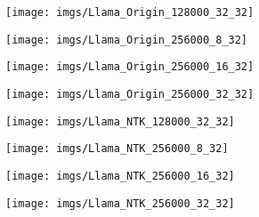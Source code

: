 
\clearpage
{}
\begin{figure*}[ht]
	\centering
	\begin{minipage}{\textwidth}
		\centering
		\begin{minipage}{0.24\textwidth}
			\centering
			\texttt{[image: imgs/Llama\_Origin\_128000\_32\_32]} %
		\end{minipage}%
		\begin{minipage}{0.24\textwidth}
			\centering
			\texttt{[image: imgs/Llama\_Origin\_256000\_8\_32]} %
		\end{minipage}%
		\begin{minipage}{0.24\textwidth}
			\centering
			\texttt{[image: imgs/Llama\_Origin\_256000\_16\_32]} %
		\end{minipage}%
		\begin{minipage}{0.24\textwidth}
			\centering
			\texttt{[image: imgs/Llama\_Origin\_256000\_32\_32]} %
		\end{minipage}
	\end{minipage}
	\begin{minipage}{\textwidth}
		\centering
		\begin{minipage}{0.24\textwidth}
			\centering
			\texttt{[image: imgs/Llama\_NTK\_128000\_32\_32]} %
		\end{minipage}%
		\begin{minipage}{0.24\textwidth}
			\centering
			\texttt{[image: imgs/Llama\_NTK\_256000\_8\_32]} %
		\end{minipage}%
		\begin{minipage}{0.24\textwidth}
			\centering
			\texttt{[image: imgs/Llama\_NTK\_256000\_16\_32]} %
		\end{minipage}%
		\begin{minipage}{0.24\textwidth}
			\centering
			\texttt{[image: imgs/Llama\_NTK\_256000\_32\_32]} %
		\end{minipage}
	\end{minipage}

\end{figure*}
